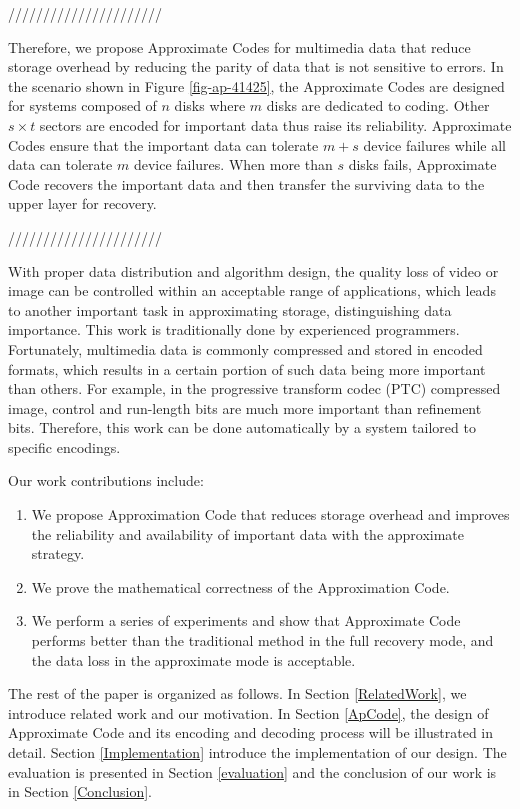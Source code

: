 \documentclass[sigconf]{acmart}
\begin{document}
//////////////////////

Therefore, we propose Approximate Codes for multimedia data that reduce storage overhead by reducing the parity of data that is not sensitive to errors. In the scenario shown in Figure \ref{fig-ap-41425}, the Approximate Codes are designed for systems composed of $n$ disks where $m$ disks are dedicated to coding.
Other $s \times t$ sectors are encoded for important data thus raise its reliability. Approximate Codes ensure that the important data can tolerate $m+s$ device failures while all data can tolerate $m$ device failures.
When more than $s$ disks fails, Approximate Code recovers the important data and then transfer the surviving data to the upper layer for recovery. 

//////////////////////

With proper data distribution and algorithm design, the quality loss of video or image can be controlled within an acceptable range of applications, which leads to another important task in approximating storage, distinguishing data importance.
This work is traditionally done by experienced programmers. Fortunately, multimedia data is commonly compressed and stored in encoded formats, which results in a certain portion of such data being more important than others. For example, in the progressive transform codec (PTC) compressed image, control and run-length bits are much more important than refinement bits. Therefore, this work can be done automatically by a system tailored to specific encodings.

Our work contributions include:
\begin{enumerate}
\item We propose Approximation Code that reduces storage overhead and improves the reliability and availability of important data with the approximate strategy.
\item We prove the mathematical correctness of the Approximation Code.
\item We perform a series of experiments and show that Approximate Code performs better than the traditional method in the full recovery mode, and the data loss in the approximate mode is acceptable.
\end{enumerate}

The rest of the paper is organized as follows. In Section \ref{RelatedWork}, we introduce related work and our motivation. 
In Section \ref{ApCode}, the design of Approximate Code and its encoding and decoding process will be illustrated in detail. 
Section \ref{Implementation} introduce the implementation of our design.
The evaluation is presented in Section \ref{evaluation} and the conclusion of our work is in Section \ref{Conclusion}. 
\end{document}
